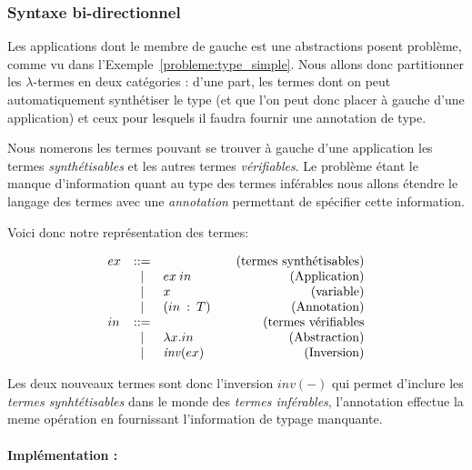 \documentclass {article}
\makeatletter
\theoremstyle{definition}
\theoremstyle{remark}
\newenvironment{bnf}
               {\[\begin{array}{lcl@{\qquad}r}}
               {\end{array}\]}
\makeatother
\begin{document}
\subsubsection{Syntaxe bi-directionnel}

Les applications dont le membre de gauche est une abstractions posent
problème, comme vu dans l'Exemple~\ref{probleme:type_simple}.  Nous
allons donc partitionner les \(\lambda\)-termes en deux catégories :
d'une part, les termes dont on peut automatiquement synthétiser le
type (et que l'on peut donc placer à gauche d'une application) et ceux
pour lesquels il faudra fournir une annotation de type.


Nous nomerons les termes pouvant se trouver à gauche d'une application
les termes \emph{synthétisables} et les autres termes
\emph{vérifiables}.  Le problème étant le manque d'information quant
au type des termes inférables nous allons étendre le langage des
termes avec une \emph{annotation} permettant de spécifier cette
information.

\newcommand{\Inv}[1]{\ensuremath{\mathit{inv}(#1)}}
\newcommand{\Ann}[2]{\ensuremath{(#1\: :\: #2)}}

Voici donc notre représentation des termes:
 
\begin{bnf}
  ex &::= &&\mbox{(termes synthétisables)} \\
  &|& \App{ex}{in} & \mbox{(Application)} \\
  &|& \Var{x} & \mbox{(variable)} \\
  &|& \Ann{in}{T} & \mbox{(Annotation)} \\
  in &::= &&\mbox{(termes vérifiables} \\
  &|& \Lam{x}{in} & \mbox{(Abstraction)} \\
  &|& \Inv{ex} & \mbox{(Inversion)}
\end{bnf}

Les deux nouveaux termes sont donc l'inversion \Inv{-} qui permet d'inclure les 
\emph{termes synhtétisables} dans le monde des \emph{termes inférables}, l'annotation 
effectue la meme opération en fournissant l'information de typage manquante.

\newcommand{\verif}{vérification de type}
\newcommand{\synth}{synthèse de type}
\newcommand{\verifterme}{termes vérifiables}
\newcommand{\synthterme}{termes synthétisables}


\paragraph{Implémentation :}
\end{document}
